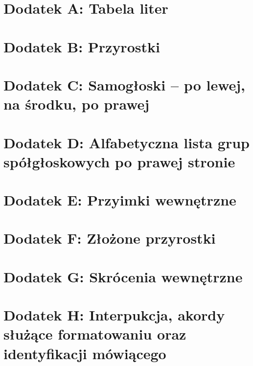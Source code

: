 \documentclass[12p, oneside]{book}
\begin{document}
\section{Dodatek A: Tabela liter}
\newpage
\section{Dodatek B: Przyrostki}
\newpage
\section{Dodatek C: Samogłoski -- po lewej, na środku, po prawej}
\newpage
\section{Dodatek D: Alfabetyczna lista grup spółgłoskowych po prawej stronie}
\newpage
\section{Dodatek E: Przyimki wewnętrzne}
\newpage
\section{Dodatek F: Złożone przyrostki}
\newpage
\section{Dodatek G: Skrócenia wewnętrzne}
\newpage
\section{Dodatek H: Interpukcja, akordy służące formatowaniu oraz identyfikacji mówiącego}
\end{document}

